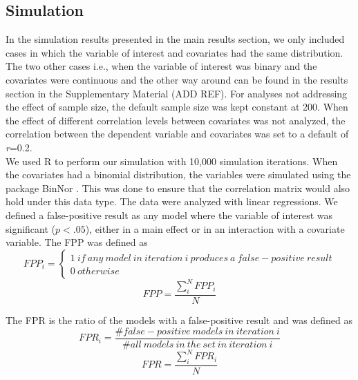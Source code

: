\subsection{Simulation}
In the simulation results presented in the main results section, we only included cases in which the variable of interest and covariates had the same distribution. The two other cases i.e., when the variable of interest was binary and the covariates were continuous and the other way around can be found in the results section in the Supplementary Material (ADD REF). For analyses not addressing the effect of sample size, the default sample size was kept constant at 200. When the effect of different correlation levels between covariates was not analyzed, the correlation between the dependent variable and covariates was set to a default of \textit{r}=0.2.\\
We used R \citep{Team2018} to perform our simulation with 10,000 simulation iterations. When the covariates had a binomial distribution, the variables were simulated using the package BinNor \citep{Demirtas2014}. This was done to ensure that the correlation matrix would also hold under this data type. The data were analyzed with linear regressions. We defined a false-positive result as any model where the variable of interest was significant ($p < .05$), either in a main effect or in an interaction with a covariate variable. The FPP was defined as \\

\[FPP_i=\left. \left\{\begin{array}{c}
1\ if\ any\ model\ in\ iteration\ i\ produces\ a\ false-positive\ result \\ 
0\ otherwise\  \end{array}
\right.\] 
\[FPP=\frac{\sum_{i}^{N}{FPP_i}}{N}\] 

The FPR is the ratio of the models with a false-positive result and was defined as \\

\[FPR_i=\frac{\#false-positive\ models\ in\ iteration\ i}{\#all\ models\ in\ the\ set\ in\ iteration\ i}\] 
\[FPR=\frac{\sum_{i}^{N}{FPR_i}}{N}\] 



